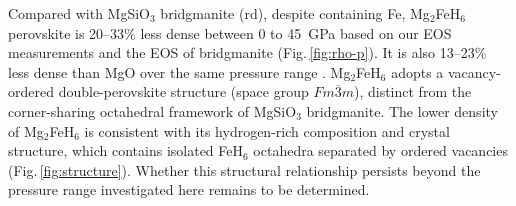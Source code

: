 \documentclass[draft,jgrga,12pt]{agujournal2019}
\begin{document}
Compared with MgSiO$_3$ bridgmanite (rd), despite containing Fe, Mg$_2$FeH$_6$ perovskite is 20--33\% less dense between 0 to 45~{GPa} based on our EOS measurements and the EOS of bridgmanite \cite{tange_pvt_2012} (Fig.\,\ref{fig:rho-p}). 
It is also 13--23\% less dense than MgO over the same pressure range \cite{dorogokupets_equations_2007}.
Mg$_2$FeH$_6$ adopts a vacancy-ordered double-perovskite structure (space group $Fm\overline{3}m$), distinct from the corner-sharing octahedral framework of MgSiO$_3$ bridgmanite.
The lower density of Mg$_2$FeH$_6$ is consistent with its hydrogen-rich composition and crystal structure, which contains isolated FeH$_6$ octahedra separated by ordered vacancies (Fig.\,\ref{fig:structure}). 
Whether this structural relationship persists beyond the pressure range investigated here remains to be determined.




\end{document}
